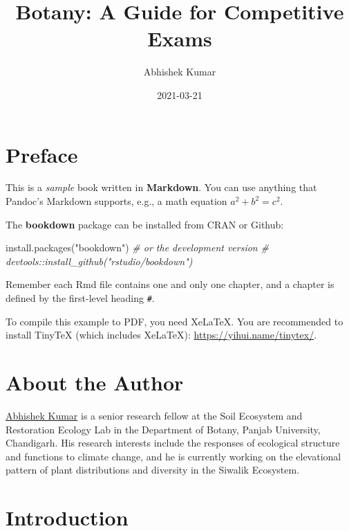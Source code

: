 \documentclass[
]{book}
\title{Botany: A Guide for Competitive Exams}
\author{Abhishek Kumar}
\date{2021-03-21}
\newenvironment{Shaded}{\begin{snugshade}}{\end{snugshade}}
\newcommand{\CommentTok}[1]{\textcolor[rgb]{0.56,0.35,0.01}{\textit{#1}}}
\newcommand{\FunctionTok}[1]{\textcolor[rgb]{0.00,0.00,0.00}{#1}}
\newcommand{\NormalTok}[1]{#1}
\newcommand{\StringTok}[1]{\textcolor[rgb]{0.31,0.60,0.02}{#1}}
\begin{document}
\maketitle

{
\setcounter{tocdepth}{1}
\tableofcontents
}
\hypertarget{preface}{%
\chapter*{Preface}\label{preface}}

This is a \emph{sample} book written in \textbf{Markdown}. You can use anything that Pandoc's Markdown supports, e.g., a math equation \(a^2 + b^2 = c^2\).

The \textbf{bookdown} package can be installed from CRAN or Github:

\begin{Shaded}
\begin{Highlighting}[]
\FunctionTok{install.packages}\NormalTok{(}\StringTok{"bookdown"}\NormalTok{)}
\CommentTok{\# or the development version}
\CommentTok{\# devtools::install\_github("rstudio/bookdown")}
\end{Highlighting}
\end{Shaded}

Remember each Rmd file contains one and only one chapter, and a chapter is defined by the first-level heading \texttt{\#}.

To compile this example to PDF, you need XeLaTeX. You are recommended to install TinyTeX (which includes XeLaTeX): \url{https://yihui.name/tinytex/}.

\hypertarget{about-the-author}{%
\chapter*{About the Author}\label{about-the-author}}

\href{https://akumar.netlify.app/}{Abhishek Kumar} is a senior research fellow at the Soil Ecosystem and Restoration Ecology Lab in the Department of Botany, Panjab University, Chandigarh. His research interests include the responses of ecological structure and functions to climate change, and he is currently working on the elevational pattern of plant distributions and diversity in the Siwalik Ecosystem.

\hypertarget{intro}{%
\chapter{Introduction}\label{intro}}
\end{document}
